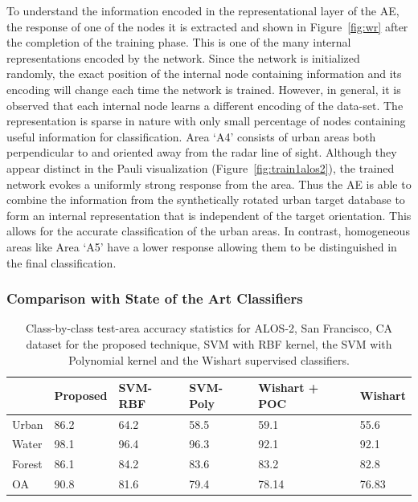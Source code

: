  To understand the information encoded in the representational layer of the AE, the response of one of the nodes it is extracted and shown in  Figure~\ref{fig:wr} after the completion of the training phase. This is one of the many internal representations encoded by the network. Since the network is initialized randomly, the exact position of the internal node containing information and its encoding will change each time the network is trained. However, in general, it is observed that each internal node learns a different encoding of the data-set. 
	The representation is sparse in nature with only small percentage of nodes containing useful information for classification. 
	Area `A4' consists of urban areas both perpendicular to and oriented away from the radar line of sight. Although they appear distinct in the Pauli visualization (Figure~\ref{fig:train1alos2}), the trained network evokes a uniformly strong response from the area. Thus the AE is able to combine the information from the synthetically rotated urban target database to form an internal representation that is independent of the target orientation. This allows for the accurate classification of the urban areas. In contrast, homogeneous areas like Area `A5' have a lower response allowing them to be distinguished  in the final classification.  



\subsubsection{Comparison with State of the Art Classifiers}
\label{sec:EXPT4}


\begin{table}[t]
\centering

\caption{Class-by-class test-area accuracy statistics for ALOS-2, San Francisco, CA dataset for the proposed technique, SVM with RBF kernel, the SVM with Polynomial kernel and the Wishart supervised classifiers. }
\label{tab:alos_comparison} 
\begin{tabularx}{\columnwidth}{X|XXXXX} 
 & Proposed & SVM-RBF  & SVM-Poly & Wishart + POC& Wishart  \\ \hline
Urban & 86.2 & 64.2 & 58.5 & 59.1 & 55.6 \\
Water & 98.1 & 96.4 & 96.3 & 92.1 & 92.1 \\
Forest & 86.1 & 84.2 & 83.6 & 83.2 & 82.8 \\ \hline
OA & 90.8  & 81.6 & 79.4 & 78.14 & 76.83  \\ 
\end{tabularx}
\end{table}

